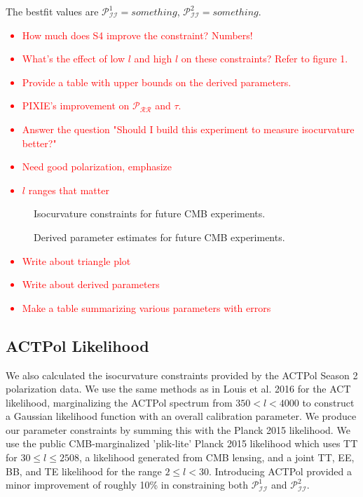 \documentclass{emulateapj}
\newcommand\writingnote[1]{\textcolor{red}{#1}}
\newcommand\prr{ \mathcal{P}_{\mathcal{R}\mathcal{R}} }
\newcommand\pii{ \mathcal{P}_{\mathcal{I}\mathcal{I}} }
\begin{document}
The bestfit values are $\pii^1 = something$, $\pii^2 = something$.

\writingnote{
  \begin{itemize}
    \item How much does S4 improve the constraint? Numbers! 
    \item What's the effect of low $l$ and high $l$ on these constraints? Refer to figure 1. 
    \item Provide a table with upper bounds on the derived parameters.
    \item PIXIE's improvement on $\prr$ and $\tau$. 
    \item Answer the question "Should I build this experiment to measure isocurvature better?"
    \item Need good polarization, emphasize
    \item $l$ ranges that matter
  \end{itemize}
}

\afterpage{\clearpage}
\begin{figure}[p]
\caption{Isocurvature constraints for future CMB experiments.\label{fig:triangleplots}}
\end{figure}



\afterpage{\clearpage}
\begin{figure}[p]
\caption{Derived parameter estimates for future CMB experiments.\label{fig:derivedparams}}
\end{figure}

\writingnote{
    \begin{itemize}
        \item Write about triangle plot
        \item Write about derived parameters
        \item Make a table summarizing various parameters with errors
    \end{itemize}
}




\subsection{ACTPol Likelihood}\label{actpol}

We also calculated the isocurvature constraints provided by the ACTPol Season 2 polarization data. We use the same methods as in Louis et al. 2016 for the ACT likelihood, marginalizing the ACTPol spectrum from $350 < l < 4000$ to construct a Gaussian likelihood function with an overall calibration parameter. We produce our parameter constraints by summing this with the Planck 2015 likelihood. We use the public CMB-marginalized 'plik-lite' Planck 2015 likelihood which uses TT for $30 \leq l \leq 2508$, a likelihood generated from CMB lensing, and a joint TT, EE, BB, and TE likelihood for the range $2 \leq l < 30$. Introducing ACTPol provided a minor improvement of roughly 10\% in constraining both $\pii^1$ and $\pii^2$.
\end{document}
